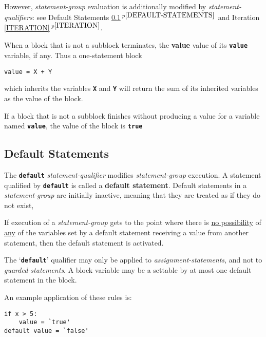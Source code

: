 \documentclass[12pt]{article}
\newcommand{\TT}[1]{{\tt \bfseries #1}}
\newcommand{\key}[1]{{\rm \bfseries #1}}
\newcommand{\ttkey}[1]{{\tt \bfseries #1}}
\newcommand{\itemref}[1]{\ref{#1}$\,^{p\pageref{#1}}$}
\newenvironment{indpar}[1][0.3in]%
	{\begin{list}{}%
		     {\setlength{\itemsep}{0in}%
		      \setlength{\topsep}{0in}%
		      \setlength{\parsep}{1ex}%
		      \setlength{\labelwidth}{#1}%
		      \setlength{\leftmargin}{#1}%
		      \addtolength{\leftmargin}{\labelsep}}%
	 \item}%
	{\end{list}}
\begin{document}
\begin{enumerate}
However, {\em statement-group}
evaluation is additionally modified by {\em statement-qualifiers}:
see Default Statements \itemref{DEFAULT-STATEMENTS}
and Iteration \itemref{ITERATION}.

\item
When a block that is not a subblock
terminates, the \key{value}
value of its \TT{value} variable\index{value variable@\TT{value} variable},
if any.  Thus a one-statement block

\begin{indpar}
\verb|value = X + Y|
\end{indpar}

which inherits the variables \TT{X} and \TT{Y} will return
the sum of its inherited variables as the value of the block.

If a block that is not a subblock
finishes without producing a value for a variable named
\TT{value}, the value of the block is \ttkey{true}

\end{enumerate}

\subsection{Default Statements}
\label{DEFAULT-STATEMENTS}

The \ttkey{default} {\em statement-qualifier} modifies {\em statement-group}
execution.  A statement qualified by \TT{default}
is called a \key{default statement}.  Default statements in a
{\em statement-group}
are initially inactive, meaning that they are treated as if they do not exist,

If execution of a {\em statement-group} gets to the point where there
is \underline{no possibility} of \underline{any} of the variables
set by a default statement receiving a value from another statement,
then the default statement is activated.

The `\TT{default}' qualifier may only be applied to {\em assignment-statements},
and not to {\em guarded-statements}.
A block variable may be a settable by at most one default statement in
the block.

An example application of these rules is:

\begin{indpar}\begin{verbatim}
if x > 5:
    value = `true'
default value = `false'
\end{verbatim}\end{indpar}
\end{document}
